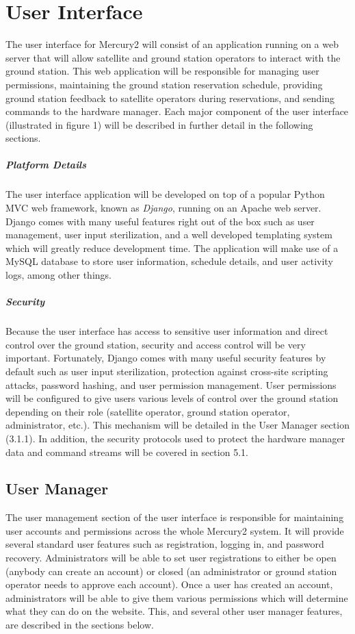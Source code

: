 \documentclass{mxl-design}
\begin{document}
\section{User Interface}
The user interface for Mercury2 will consist of an application running on a web server that will allow satellite and ground station operators to interact with the ground station. This web application will be responsible for managing user permissions, maintaining the ground station reservation schedule, providing ground station feedback to satellite operators during reservations, and sending commands to the hardware manager. Each major component of the user interface (illustrated in figure 1) will be described in further detail in the following sections.

\subparagraph{Platform Details}
The user interface application will be developed on top of a popular Python MVC web framework, known as \textit{Django}, running on an Apache web server. Django comes with many useful features right out of the box such as user management, user input sterilization, and a well developed templating system which will greatly reduce development time. The application will make use of a MySQL database to store user information, schedule details, and user activity logs, among other things.

\subparagraph{Security}
Because the user interface has access to sensitive user information and direct control over the ground station, security and access control will be very important. Fortunately, Django comes with many useful security features by default such as user input sterilization, protection against cross-site scripting attacks, password hashing, and user permission management. User permissions will be configured to give users various levels of control over the ground station depending on their role (satellite operator, ground station operator, administrator, etc.). This mechanism will be detailed in the User Manager section (3.1.1). In addition, the security protocols used to protect the hardware manager data and command streams will be covered in section 5.1.

\subsection{User Manager}
The user management section of the user interface is responsible for maintaining user accounts and permissions across the whole Mercury2 system. It will provide several standard user features such as registration, logging in, and password recovery. Administrators will be able to set user registrations to either be open (anybody can create an account) or closed (an administrator or ground station operator needs to approve each account). Once a user has created an account, administrators will be able to give them various permissions which will determine what they can do on the website. This, and several other user manager features, are described in the sections below.
\end{document}
